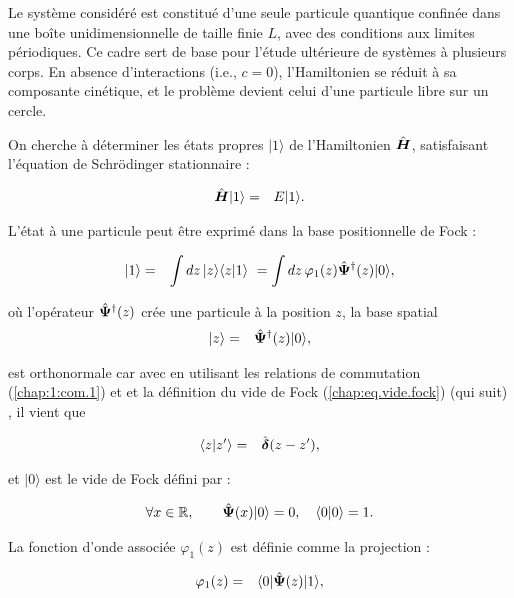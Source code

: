 Le système considéré est constitué d’une seule particule quantique confinée dans une boîte unidimensionnelle de taille finie \(L\), avec des conditions aux limites périodiques. Ce cadre sert de base pour l’étude ultérieure de systèmes à plusieurs corps. En absence d’interactions (i.e., \(c = 0\)), l’Hamiltonien se réduit à sa composante cinétique, et le problème devient celui d’une particule libre sur un cercle.

On cherche à déterminer les états propres \(\vert 1 \rangle\) de l’Hamiltonien \(\hat{\bm{H}}\), satisfaisant l’équation de Schrödinger stationnaire :

\begin{eqnarray}
	\hat{\bm{H}} \vert 1 \rangle & = & E \vert 1 \rangle.
\end{eqnarray}

L’état à une particule peut être exprimé dans la base positionnelle de Fock :

\begin{eqnarray}
	\vert 1 \rangle & = & \int dz\, \vert z \rangle \langle z \vert 1 \rangle ~= \int dz\, \varphi_1(z) \hat{\bm{\Psi}}^\dag(z) \vert 0 \rangle,
\end{eqnarray}

où l’opérateur \(\hat{\bm{\Psi}}^\dag(z)\) crée une particule à la position \(z\), la base spatial
\begin{eqnarray}
	\vert z \rangle  & = & \hat{\bm{\Psi}}^\dag (z)\vert 0 \rangle ,
\end{eqnarray}

est orthonormale car avec en utilisant les relations de commutation (\ref{chap:1:com.1}) et et la définition du vide de Fock (\ref{chap:eq.vide.fock}) (qui suit) , il vient que 

\begin{eqnarray}
	\langle z\vert z' \rangle  & = & \hat{\bm{\delta}}(z -z') ,
\end{eqnarray}

et \(\vert 0 \rangle\) est le vide de Fock défini par :

\begin{eqnarray}
	\forall x \in \mathbb{R}, \qquad \hat{\bm{\Psi}}(x) \vert 0 \rangle = 0 ,\quad  \langle 0\vert 0 \rangle = 1. \label{chap:eq.vide.fock}
\end{eqnarray}

La fonction d’onde associée \(\varphi_1(z)\) est définie comme la projection :

\begin{eqnarray}
	\varphi_1(z) & = & \langle 0 \vert \hat{\bm{\Psi}}(z) \vert 1 \rangle,
\end{eqnarray}


